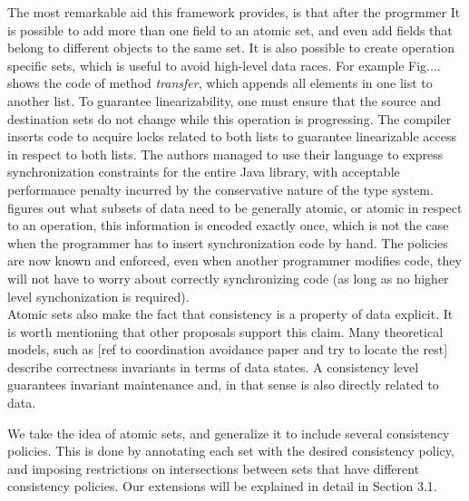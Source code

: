 
The most remarkable aid this framework provides, is that after the progrmmer
It is possible to add
more than one field to an atomic set, and even add fields that belong to different
objects to the same set. It is also possible to create operation specific sets,
which is useful to avoid high-level data races. For example Fig.... shows the
code of method \emph{transfer}, which appends all elements in one list to
another list. To guarantee linearizability, one must ensure that the source and destination
sets do not change while this operation is progressing. The compiler inserts
code to acquire locks related to both lists to guarantee linearizable access in
respect to both lists. The authors managed to use their language to express
synchronization constraints for the entire Java library, with acceptable
performance penalty incurred by the conservative nature of the type system. \\

figures out what subsets of data need to be generally atomic, or atomic in
respect to an operation, this information is encoded
exactly once, which is not the case when the programmer has to insert
synchronization code by hand. The policies are now known and enforced, even when
another programmer modifies code, they will not have to worry about correctly
synchronizing code (as long as no higher level synchonization is required). \\

Atomic sets also make the fact that consistency is a property of data explicit.
It is worth mentioning that other proposals support this claim. Many theoretical
models, such as [ref to coordination avoidance paper and try to locate the rest]
describe correctness invariants in terms of data states. A consistency level
guarantees invariant maintenance and, in that sense is also directly related to
data.

We take the idea of atomic sets, and generalize it to include several
consistency policies. This is done by annotating each set with the desired
consistency policy, and imposing restrictions on intersections between sets that
have different consistency policies. Our extensions will be explained in detail in Section 3.1.

